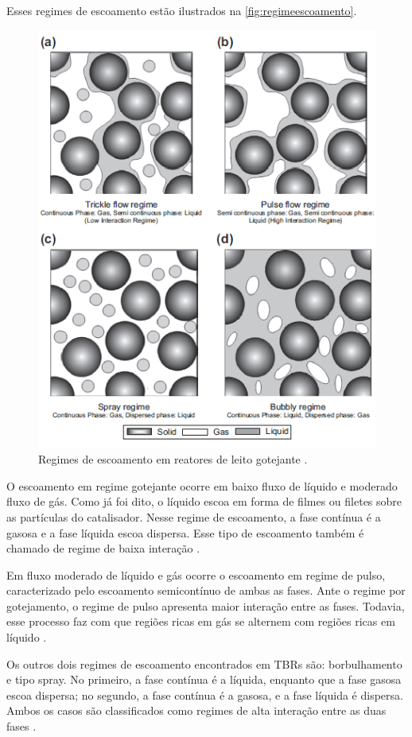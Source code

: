 Esses regimes de escoamento estão ilustrados na \autoref{fig:regimeescoamento}.

 \begin{figure}[htb]
 \centering \includegraphics[scale=0.75]{images/Chap2/regimeescoamento.png}
 \caption{Regimes de escoamento em reatores de leito gotejante \cite{Gunjal2005}.}
 \label{fig:regimeescoamento}
 \end{figure}

O escoamento em regime gotejante ocorre em baixo fluxo de líquido e moderado
fluxo de gás. Como já foi dito, o líquido escoa em forma de filmes ou filetes
sobre as partículas do catalisador. Nesse regime de escoamento, a fase contínua
é a gasosa e a fase líquida escoa dispersa. Esse tipo de escoamento também é
chamado de regime de baixa interação \cite{Saroha1996}.

Em fluxo moderado de líquido e gás ocorre o escoamento em regime de pulso,
caracterizado pelo escoamento semicontínuo de ambas as fases. Ante o regime
por gotejamento, o regime de pulso apresenta maior interação entre as fases.
Todavia, esse processo faz com que regiões ricas em gás se alternem com regiões
ricas em líquido \cite{Saroha1996}.

Os outros dois regimes de escoamento encontrados em TBRs são: borbulhamento e
tipo spray. No primeiro, a fase contínua é a líquida, enquanto que a fase gasosa
escoa dispersa; no segundo, a fase contínua é a gasosa, e a fase líquida é
dispersa. Ambos os casos são classificados como regimes de alta interação entre
as duas fases \cite{Saroha1996}.

